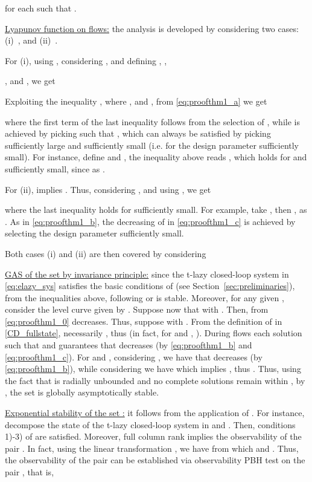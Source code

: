 \documentclass[twocolumn]{autart}
\begin{document}
for each  such that . 

{ \underline{Lyapunov function on flows:}}
the analysis is developed by considering two cases:
(i)~, and (ii)~.

For (i), using , 
considering , and defining
, 
,

, and
, 
we get

Exploiting the inequality , 
where , and , 
from \eqref{eq:proofthm1_a} we get

{where the first term of the last inequality follows from 
the selection of ,
while  is achieved by picking
 such that
,
which can always be satisfied by picking  sufficiently large and 
 sufficiently small (i.e. for the design parameter
 sufficiently small). 
For instance, define  and
,
the inequality above reads 
,
which holds for 
 and  sufficiently
small, since  as .
}  


For (ii),  implies .
Thus, considering , and
using , 
we get

{
where the last inequality holds for  sufficiently small.
For example, take , then
, as .
As in \eqref{eq:proofthm1_b}, the decreasing of  in
\eqref{eq:proofthm1_c} is achieved by selecting the design parameter
 sufficiently small. 
}

{
Both cases (i) and (ii) are then covered by considering 

}



{ \underline{GAS of the set  by invariance principle:}}
since the t-lazy closed-loop system in \eqref{eq:elazy_sys} 
satisfies the basic conditions of \cite{GoebelCSM09} (see Section~\ref{sec:preliminaries}), 
from the inequalities above, following \cite[Theorem 23]{GoebelCSM09} 
or \cite{SanfeliceTAC07}  is stable. Moreover, for any given ,
consider the level curve given by .
Suppose now
that  with .
Then, from \eqref{eq:proofthm1_0}  decreases. Thus, 
suppose  with .
From the definition of  in \eqref{CD_fullstate},
necessarily , thus  (in fact, for  and , 
).
During flows each solution  such that 
 and   
guarantees that  decreases 
(by \eqref{eq:proofthm1_b} and \eqref{eq:proofthm1_c}).  
For  and , 
considering , we have that  decreases 
(by \eqref{eq:proofthm1_b}), while considering 
we have  which implies 
, thus .
Thus, using the fact that  is radially unbounded and
no complete solutions remain within , 
by \cite[Theorem 23]{GoebelCSM09}, the set  is globally asymptotically stable.

{ \underline{Exponential stability of the set :}}
it follows from the application of 
\cite[Theorem 2]{TeelTAC13}. 
For instance, 
decompose the state of the t-lazy closed-loop system 
in  and . Then,
conditions 1)-3) of \cite[Assumption 1]{TeelTAC13}
are satisfied. 
Moreover,  full column rank implies 
the observability of the pair . In fact, 
using the linear transformation ,
we have  from which
 and . 
Thus, the observability of the pair 
can be established via observability PBH test on the pair 
, that is, 
\end{document}
